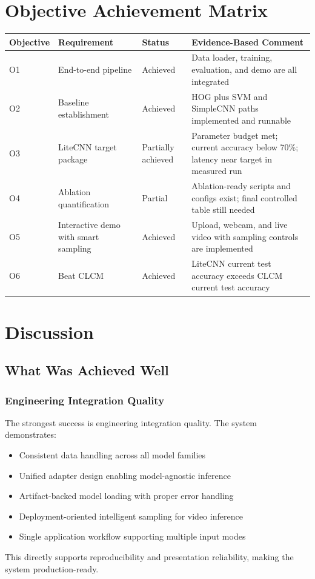 \documentclass[12pt,a4paper]{article}
\begin{document}
\section{Objective Achievement Matrix}

\begin{table}[h!]
\centering
\small
\begin{tabularx}{\textwidth}{@{}l l l X@{}}
\toprule
Objective & Requirement & Status & Evidence-Based Comment \\
\midrule
O1 & End-to-end pipeline & Achieved & Data loader, training, evaluation, and demo are all integrated \\
O2 & Baseline establishment & Achieved & HOG plus SVM and SimpleCNN paths implemented and runnable \\
O3 & LiteCNN target package & Partially achieved & Parameter budget met; current accuracy below 70\%; latency near target in measured run \\
O4 & Ablation quantification & Partial & Ablation-ready scripts and configs exist; final controlled table still needed \\
O5 & Interactive demo with smart sampling & Achieved & Upload, webcam, and live video with sampling controls are implemented \\
O6 & Beat CLCM & Achieved & LiteCNN current test accuracy exceeds CLCM current test accuracy \\
\bottomrule
\end{tabularx}
\end{table}

\section{Discussion}

\subsection{What Was Achieved Well}

\subsubsection{Engineering Integration Quality}
The strongest success is engineering integration quality. The system demonstrates:
\begin{itemize}[leftmargin=*]
    \item Consistent data handling across all model families
    \item Unified adapter design enabling model-agnostic inference
    \item Artifact-backed model loading with proper error handling
    \item Deployment-oriented intelligent sampling for video inference
    \item Single application workflow supporting multiple input modes
\end{itemize}
This directly supports reproducibility and presentation reliability, making the system production-ready.
\end{document}
